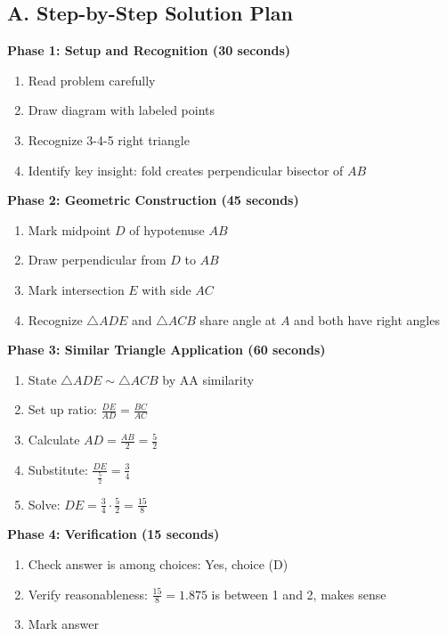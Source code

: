 \documentclass[12pt]{article}
\begin{document}
\begin{roadmapbox}
\subsection*{A. Step-by-Step Solution Plan}

\textbf{Phase 1: Setup and Recognition (30 seconds)}
\begin{enumerate}
    \item Read problem carefully
    \item Draw diagram with labeled points
    \item Recognize 3-4-5 right triangle
    \item Identify key insight: fold creates perpendicular bisector of $AB$
\end{enumerate}

\textbf{Phase 2: Geometric Construction (45 seconds)}
\begin{enumerate}
    \item Mark midpoint $D$ of hypotenuse $AB$
    \item Draw perpendicular from $D$ to $AB$
    \item Mark intersection $E$ with side $AC$
    \item Recognize $\triangle ADE$ and $\triangle ACB$ share angle at $A$ and both have right angles
\end{enumerate}

\textbf{Phase 3: Similar Triangle Application (60 seconds)}
\begin{enumerate}
    \item State $\triangle ADE \sim \triangle ACB$ by AA similarity
    \item Set up ratio: $\frac{DE}{AD} = \frac{BC}{AC}$
    \item Calculate $AD = \frac{AB}{2} = \frac{5}{2}$
    \item Substitute: $\frac{DE}{\frac{5}{2}} = \frac{3}{4}$
    \item Solve: $DE = \frac{3}{4} \cdot \frac{5}{2} = \frac{15}{8}$
\end{enumerate}

\textbf{Phase 4: Verification (15 seconds)}
\begin{enumerate}
    \item Check answer is among choices: Yes, choice (D)
    \item Verify reasonableness: $\frac{15}{8} = 1.875$ is between 1 and 2, makes sense
    \item Mark answer
\end{enumerate}


\end{roadmapbox}
\end{document}

